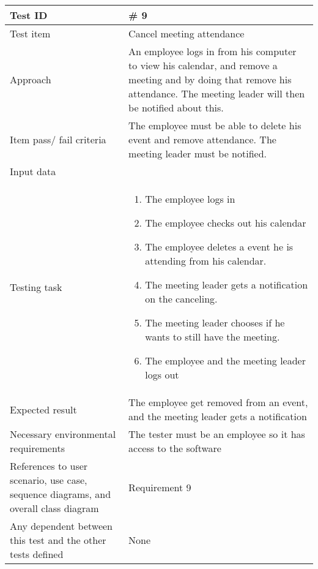 \documentclass[a4paper, 10pt]{article}
\begin{document}
\begin{tabularx}{\textwidth}{ |X|X| }
\hline
\rowcolor{Gray}
Test ID & \# 9 \\ \hline
Test item & Cancel meeting attendance \\ \hline
Approach & An employee logs in from his computer to view his calendar, and remove a meeting and by doing that remove his attendance. The meeting leader will then be notified about this. \\ \hline
Item pass/ fail criteria & The employee must be able to delete his event and remove attendance. The meeting leader must be notified.\\ \hline
Input data & 
\begin*{}
	\item Username
	\item Password
    \item Meeting to remove
\end{itemize}\\ \hline
Testing task & 
\begin{enumerate}
	\item The employee logs in
	\item The employee checks out his calendar
	\item The employee deletes a event he is attending from his calendar.
    \item The meeting leader gets a notification on the canceling.
    \item The meeting leader chooses if he wants to still have the meeting.
	\item The employee and the meeting leader logs out
\end{enumerate} \\ \hline
Expected result & The employee get removed from an event, and the meeting leader gets a notification \\ \hline
Necessary environmental requirements & The tester must be an employee so it has access to the software  \\ \hline
References to user scenario, use case, sequence diagrams, and overall class diagram & Requirement 9 \\ \hline
Any dependent between this test and the other tests defined & None   \\ \hline


\end{tabularx}
\end{document}

